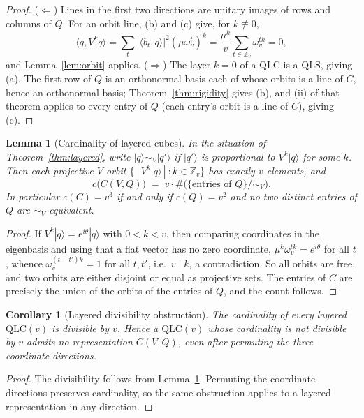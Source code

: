\documentclass[11pt]{amsart}
\newtheorem{lemma}[theorem]{Lemma}
\newtheorem{corollary}[theorem]{Corollary}
\theoremstyle{definition}
\newcommand{\Z}{\mathbb{Z}}
\newcommand{\ket}[1]{|#1\rangle}
\newcommand{\ip}[2]{\langle #1,#2\rangle}
\newcommand{\QLS}{\mathrm{QLS}}
\newcommand{\QLC}{\mathrm{QLC}}
\begin{document}
\begin{proof}
($\Leftarrow$)  Lines in the first two directions are unitary images of
rows and columns of $Q$.  For an orbit line, (b) and (c) give, for
$k\not\equiv0$,
\[
\ip{q}{V^kq}=\sum_t |\ip{b_t}{q}|^2(\mu\omega_v^t)^k
=\frac{\mu^k}{v}\sum_{t\in\Z_v}\omega_v^{tk}=0 ,
\]
and Lemma~\ref{lem:orbit} applies.
($\Rightarrow$)  The layer $k=0$ of a $\QLC$ is a $\QLS$, giving (a).  The
first row of $Q$ is an orthonormal basis each of whose orbits is a line of
$C$, hence an orthonormal basis; Theorem~\ref{thm:rigidity} gives (b), and
(ii) of that theorem applies to every entry of $Q$ (each entry's orbit is a
line of $C$), giving (c).
\end{proof}

\begin{lemma}[Cardinality of layered cubes]\label{lem:card}
In the situation of Theorem~\ref{thm:layered}, write $\ket q\sim_V\ket{q'}$
if $\ket{q'}$ is proportional to $V^k\ket q$ for some $k$.  Then each
projective $V$-orbit $\{[V^k\ket q]:k\in\Z_v\}$ has exactly $v$ elements,
and
\[
c\bigl(C(V,Q)\bigr)\;=\;v\cdot\#\bigl(\{\text{entries of }Q\}/\!\sim_V\bigr).
\]
In particular $c(C)=v^3$ if and only if $c(Q)=v^2$ and no two distinct
entries of $Q$ are $\sim_V$-equivalent.
\end{lemma}

\begin{proof}
If $V^k\ket q=e^{i\theta}\ket q$ with $0<k<v$, then comparing coordinates
in the eigenbasis and using that a flat vector has no zero coordinate,
$\mu^k\omega_v^{tk}=e^{i\theta}$ for all $t$, whence
$\omega_v^{(t-t')k}=1$ for all $t,t'$, i.e.\ $v\mid k$, a contradiction.
So all orbits are free, and two orbits are either disjoint or equal as
projective sets.  The entries of $C$ are precisely the union of the orbits
of the entries of $Q$, and the count follows.
\end{proof}

\begin{corollary}[Layered divisibility obstruction]
\label{cor:layered-divisibility}
The cardinality of every layered $\QLC(v)$ is divisible by $v$.  Hence a
$\QLC(v)$ whose cardinality is not divisible by $v$ admits no representation
$C(V,Q)$, even after permuting the three coordinate directions.
\end{corollary}

\begin{proof}
The divisibility follows from Lemma~\ref{lem:card}.  Permuting the coordinate
directions preserves cardinality, so the same obstruction applies to a
layered representation in any direction.
\end{proof}
\end{document}
